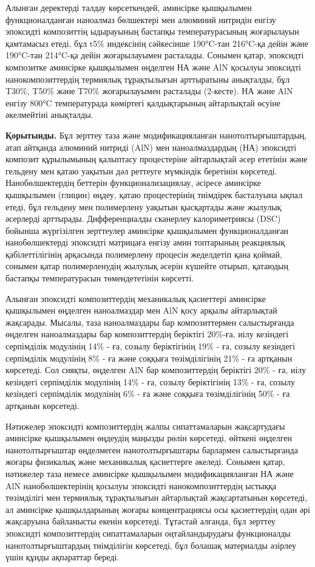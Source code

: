 Алынған деректерді талдау көрсеткендей, аминсірке қышқылымен
функционалданған наноалмаз бөлшектері мен алюминий нитридін енгізу
эпоксидті композиттің ыдырауының бастапқы температурасының жоғарылауын
қамтамасыз етеді, бұл t5\% индексінің сәйкесінше 190°C-тан 216°C-қа
дейін және 190°C-тан 214°C-қа дейін жоғарылауымен расталады. Сонымен
қатар, эпоксидті композитке аминсірке қышқылымен өңделген НА және AlN
қосылуы эпоксидті нанокомпозиттердің термиялық тұрақтылығын арттыратыны
анықталды, бұл T30\%, T50\% және T70\% жоғарылауымен расталады
(2-кесте). НА және AlN енгізу 800°C температурада көміртегі
қалдықтарының айтарлықтай өсуіне әкелмейтіні анықталды.

{\bfseries Қорытынды.} Бұл зерттеу таза және модификацияланған
нанотолтырғыштардың, атап айтқанда алюминий нитриді (AlN) мен
наноалмаздардың (НА) эпоксидті композит құрылымының қалыптасу
процестеріне айтарлықтай әсер ететінін және гельдену мен қатаю уақытын
дәл реттеуге мүмкіндік беретінін көрсетеді. Нанобөлшектердің беттерін
функционализациялау, әсіресе аминсірке қышқылымен (глицин) өңдеу, қатаю
процестерінің тиімдірек басталуына ықпал етеді, бұл гельдену мен
полимерлену уақытын қысқартады және жылулық әсерлерді арттырады.
Дифференциалды сканерлеу калориметриясы (DSC) бойынша жүргізілген
зерттеулер аминсірке қышқылымен функционалданған нанобөлшектерді
эпоксидті матрицаға енгізу амин топтарының реакциялық қабілеттілігінің
арқасында полимерлену процесін жеделдетіп қана қоймай, сонымен қатар
полимерленудің жылулық әсерін күшейте отырып, қатаюдың бастапқы
температурасын төмендететінін көрсетті.

Алынған эпоксидті композиттердің механикалық қасиеттері аминсірке
қышқылымен өңделген наноалмаздар мен AlN қосу арқылы айтарлықтай
жақсарады. Мысалы, таза наноалмаздары бар композиттермен салыстырғанда
өңделген наноалмаздары бар композиттердің беріктігі 20\%-ға, иілу
кезіндегі серпімділік модулінің 14\% - ға, созылу беріктігінің 19\% -
ға, созылу кезіндегі серпімділік модулінің 8\% - ға және соққыға
төзімділігінің 21\% - ға артқанын көрсетеді. Сол сияқты, өңделген AlN
бар композиттердің беріктігі 20\% - ға, иілу кезіндегі серпімділік
модулінің 14\% - ға, созылу беріктігінің 13\% - ға, созылу кезіндегі
серпімділік модулінің 6\% - ға және соққыға төзімділігінің 50\% - ға
артқанын көрсетеді.

Нәтижелер эпоксидті композиттердің жалпы сипаттамаларын жақсартудағы
аминсірке қышқылымен өңдеудің маңызды рөлін көрсетеді, өйткені өңделген
нанотолтырғыштар өңделмеген нанотолтырғыштары барлармен салыстырғанда
жоғары физикалық және механикалық қасиеттерге әкеледі. Сонымен қатар,
нәтижелер таза немесе аминсірке қышқылымен модификацияланған НА және AlN
нанобөлшектерінің қосылуы эпоксидті нанокомпозиттердің ыстыққа
төзімділігі мен термиялық тұрақтылығын айтарлықтай жақсартатынын
көрсетеді, ал аминсірке қышқылдарының жоғары концентрациясы осы
қасиеттердің одан әрі жақсаруына байланысты екенін көрсетеді. Тұтастай
алғанда, бұл зерттеу эпоксидті композиттердің сипаттамаларын
оңтайландырудағы функционалды нанотолтырғыштардың тиімділігін көрсетеді,
бұл болашақ материалды әзірлеу үшін құнды ақпараттар береді.

